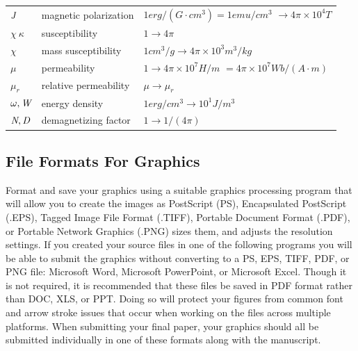 \documentclass[journal]{IEEEtranTICPS}
\begin{document}
\begin{table}[!t]
{\begin{tabular}{l l l}
			\pbox{20cm}{$ \emph{J} $ \\ \hphantom{1}} & \pbox{20cm}{magnetic polarization \\ \hphantom{1}} & \pbox{20cm}{$ 1 erg/(G \cdot cm^3) = 1 emu/cm^3 $ \\ \hphantom{1} $ \rightarrow 4\pi \times 10^{4} T $ } \\ 
			$ \chi \ \kappa $ & susceptibility & $ 1 \rightarrow 4\pi $ \\ 
			$ \chi  $ & mass susceptibility & $ 1 cm^3/g \rightarrow 4\pi \times 10^{3} m^3/kg $ \\ 
			\pbox{20cm}{$ \mu $ \\ \hphantom{1}} & \pbox{20cm}{permeability \\ \hphantom{1}} & \pbox{20cm}{$ 1 \rightarrow 4\pi \times 10^{7} H/m $ \\ \hphantom{1} $ =4\pi \times 10^{7} Wb/(A \cdot m) $ } \\ 
			$ \mu_r $ & relative permeability & $ \mu \rightarrow \mu_r $ \\ 
			$ \omega, \emph{W} $ & energy density & $ 1 erg/cm^3 \rightarrow 10^1 J/m^3 $ \\ 
			$ \emph{N}, \emph{D} $ & demagnetizing factor & $ 1 \rightarrow 1/(4\pi) $ \\ [1.4ex]
			\hline\hline
		\end{tabular}
	}
\end{table}

\subsection{File Formats For Graphics}

Format and save your graphics using a suitable graphics processing program that will allow you to create the images as PostScript (PS), Encapsulated PostScript (.EPS), Tagged Image File Format (.TIFF), Portable Document Format (.PDF), or Portable Network Graphics (.PNG) sizes them, and adjusts the resolution settings. If you created your source files in one of the following programs you will be able to submit the graphics without converting to a PS, EPS, TIFF, PDF, or PNG file: Microsoft Word, Microsoft PowerPoint, or Microsoft Excel. Though it is not required, it is recommended that these files be saved in PDF format rather than DOC, XLS, or PPT. Doing so will protect your figures from common font and arrow stroke issues that occur when working on the files across multiple platforms. When submitting your final paper, your graphics should all be submitted individually in one of these formats along with the manuscript.
\end{document}
